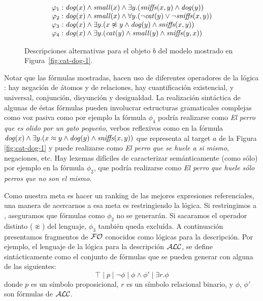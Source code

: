 \begin{figure}[H]
$$
\begin{array}{ll}
 \varphi_1:  \mathit{dog}(x) \land \mathit{small}(x) \land
   \exists y . (\mathit{sniffs}(x,y) \land \mathit{dog}(y))\\
  \varphi_2:  \mathit{dog}(x) \land \mathit{small}(x) \land
  \forall y . (\neg \mathit{cat}(y) \lor \neg \mathit{sniffs}(x,y))\\
  \varphi_3:  \mathit{dog}(x) \land
  \exists y . (x \not\approx y \land \mathit{dog}(y)  \land \mathit{sniffs}(x,y))\\
  \varphi_4:  \mathit{dog}(x) \land
  \exists y . (\mathit{cat}(y) \land \mathit{small}(y) \land \mathit{sniffs}(y,x))
 \end{array}
$$
\caption{Descripciones alternativas para el objeto $b$ del modelo mostrado en Figura~\protect\ref{fig:cat-dog-1}.}\label{tab:gammas}
\end{figure}

Notar que las f\'ormulas mostradas, hacen uso de diferentes operadores de la l\'ogica \FOL: hay negaci\'on de \'atomos y de relaciones, hay cuantificaci\'on existencial, y universal, conjunci\'on, disyunci\'on y desigualdad. La realizaci\'on sint\'actica de algunas de \'estas f\'ormulas pueden involucrar estructuras gramaticales complejas como voz pasiva como por ejemplo la f\'ormula $\phi_4$ podr\'ia realizarse como {\it El perro que es olido por un gato peque\~no}, verbos reflexivos como en la f\'ormula $\mathit{dog}(x) \land \exists y . (x \approx y \land \mathit{dog}(y) \land \mathit{sniffs}(x,y))$ que representa al target $a$ de la Figura \ref{fig:cat-dog-1} y puede realizarse como {\it El perro que se huele a si mismo}, negaciones, etc. Hay lexemas dif\'iciles de caracterizar sem\'anticamente (como s\'olo) por ejemplo en la f\'ormula $\phi_2$, que podr\'ia realizarse como {\it El perro que huele s\'olo perros que no son el mismo}.
 
Como nuestra meta es hacer un ranking de las mejores expresiones referenciales, una manera de acercarnos a esa meta es restringiendo la l\'ogica. Si restringimos a \EPFOL, aseguramos que f\'ormulas como $\phi_2$ no se generar\'an. Si sacaramos el operador distinto ($\not\approx$) del lenguaje, $\phi_3$ tambi\'en queda exclu\'ida.
A continuaci\'on presentamos fragmentos de $\mathcal{FO}$ conocidos como l\'ogicas para la descripci\'on. Por ejemplo, el lenguaje de la l\'ogica para la descripci\'on $\mathcal{ALC}$, se define sint\'acticamente como el conjunto de f\'ormulas que se pueden generar con alguna de las siguientes:
$$
\top \mid p \mid \neg \phi \mid \phi \wedge \phi' \mid  \exists r. \phi
$$
donde $p$ es un s\'imbolo proposicional, $r$ es un s\'imbolo relacional binario, y $\phi$, $\phi'$ son f\'ormulas de $\mathcal{ALC}$.

